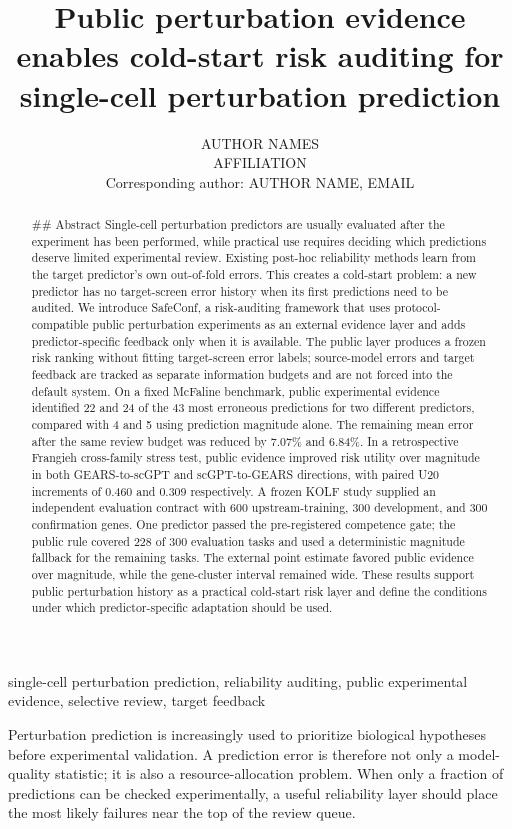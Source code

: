 \documentclass[journal]{IEEEtran}
\title{Public perturbation evidence enables cold-start risk auditing for single-cell perturbation prediction}
\author{AUTHOR NAMES\\AFFILIATION\\Corresponding author: AUTHOR NAME, EMAIL}
\begin{document}
\maketitle
\begin{abstract}
\#\# Abstract Single-cell perturbation predictors are usually evaluated after the experiment has been performed, while practical use requires deciding which predictions deserve limited experimental review. Existing post-hoc reliability methods learn from the target predictor's own out-of-fold errors. This creates a cold-start problem: a new predictor has no target-screen error history when its first predictions need to be audited. We introduce SafeConf, a risk-auditing framework that uses protocol-compatible public perturbation experiments as an external evidence layer and adds predictor-specific feedback only when it is available. The public layer produces a frozen risk ranking without fitting target-screen error labels; source-model errors and target feedback are tracked as separate information budgets and are not forced into the default system. On a fixed McFaline benchmark, public experimental evidence identified 22 and 24 of the 43 most erroneous predictions for two different predictors, compared with 4 and 5 using prediction magnitude alone. The remaining mean error after the same review budget was reduced by 7.07\% and 6.84\%. In a retrospective Frangieh cross-family stress test, public evidence improved risk utility over magnitude in both GEARS-to-scGPT and scGPT-to-GEARS directions, with paired U20 increments of 0.460 and 0.309 respectively. A frozen KOLF study supplied an independent evaluation contract with 600 upstream-training, 300 development, and 300 confirmation genes. One predictor passed the pre-registered competence gate; the public rule covered 228 of 300 evaluation tasks and used a deterministic magnitude fallback for the remaining tasks. The external point estimate favored public evidence over magnitude, while the gene-cluster interval remained wide. These results support public perturbation history as a practical cold-start risk layer and define the conditions under which predictor-specific adaptation should be used.
\end{abstract}
\begin{IEEEkeywords}
single-cell perturbation prediction, reliability auditing, public experimental evidence, selective review, target feedback
\end{IEEEkeywords}
Perturbation prediction is increasingly used to prioritize biological hypotheses before experimental validation. A prediction error is therefore not only a model-quality statistic; it is also a resource-allocation problem. When only a fraction of predictions can be checked experimentally, a useful reliability layer should place the most likely failures near the top of the review queue.
\end{document}
